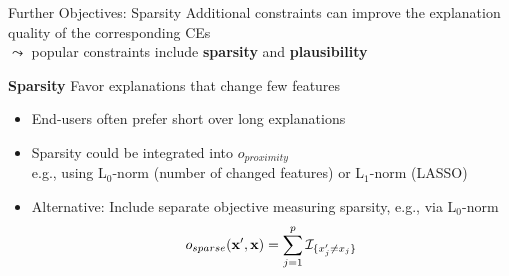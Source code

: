 \documentclass[10pt,compress,t,notes=noshow, xcolor=table]{beamer}
\begin{document}
\begin{frame}{Further Objectives: Sparsity}
	Additional constraints can improve the explanation quality of the corresponding CEs\\
	$\leadsto$ popular constraints include \textbf{sparsity} and \textbf{plausibility}
	
	\lz

	\textbf{Sparsity} Favor explanations that change few features
	\begin{itemize}[<+->]
		\item End-users often prefer short over long explanations%
        \item Sparsity could be integrated into $o_{proximity}$ \\
        e.g., using L$_0$-norm (number of changed features) or L$_1$-norm (LASSO)
        \item Alternative: Include separate objective measuring sparsity, e.g., via L$_0$-norm
        $$o_{sparse}(\mathbf{x}', \mathbf{x}) = \sum_{j = 1}^p {\mathcal{I}}_{\{ x'_j \neq x_j \}}$$
	\end{itemize}
\end{frame}
\end{document}
